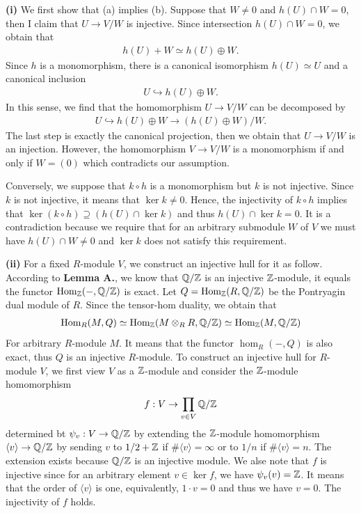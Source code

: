 \begin{solution}
    \textbf{(i)}
    We first show that (a) implies (b). Suppose that $W\neq 0$ and $h(U)\cap W = 0$, then I claim that $U\to V/W$ is injective.
    Since intersection $h(U)\cap W = 0$, we obtain that
    \begin{align*}
        h(U)+W\simeq h(U)\oplus W.
    \end{align*}
    Since $h$ is a monomorphism, there is a canonical isomorphism $h(U)\simeq U$ and a canonical inclusion
    \begin{align*}
        U\hookrightarrow h(U)\oplus W.
    \end{align*}
    In this sense, we find that the homomorphism $U\to V/W$ can be decomposed by 
    \begin{align*}
        U \hookrightarrow h(U)\oplus W \to (h(U)\oplus W)/W.
    \end{align*}
    The last step is exactly the canonical projection, then we obtain that $U\to V/W$ is an injection.
    However, the homomorphism $V\to V/W$ is a monomorphism if and only if $W=(0)$ which contradicts our assumption.

    Conversely, we suppose that $k\circ h$ is a monomorphism but $k$ is not injective. 
    Since $k$ is not injective, it means that $\ker k\neq 0$. Hence, the injectivity of $k\circ h$ implies that $\ker (k\circ h)\supseteq (h(U)\cap \ker k)$ and thus
    $h(U)\cap \ker k=0$. It is a contradiction because we require that for an arbitrary submodule $W$ of $V$ we must have $h(U)\cap W \neq 0$ and $\ker k$ does not satisfy this requirement.

    \textbf{(ii)} For a fixed $R$-module $V$, we construct an injective hull for it as follow.
    According to \textbf{Lemma A.}, we know that $\mathbb{Q}/\mathbb{Z}$ is an injective $\mathbb{Z}$-module, it equals the functor $\operatorname{Hom}_{\mathbb{Z}}(-,\mathbb{Q}/\mathbb{Z})$ is exact.
    Let $Q=\operatorname{Hom}_{\mathbb{Z}}(R,\mathbb{Q}/\mathbb{Z})$ be the Pontryagin dual module of $R$. Since the tensor-hom duality, we obtain that 
    \begin{align*}
        \operatorname{Hom}_R(M,Q)\simeq \operatorname{Hom}_{\mathbb{Z}}(M\otimes_R R,\mathbb{Q}/\mathbb{Z})\simeq \operatorname{Hom}_{\mathbb{Z}}(M,\mathbb{Q}/\mathbb{Z})
    \end{align*}
    For arbitrary $R$-module $M$.
    It means that the functor $\hom_R(-,Q)$ is also exact, thus $Q$ is an injective $R$-module.
    To construct an injective hull for $R$-module $V$, we first view $V$ as a $\mathbb{Z}$-module and consider the $\mathbb{Z}$-module homomorphism
    \begin{align*}
        f:V \to \prod_{v\in V}\mathbb{Q}/\mathbb{Z} 
    \end{align*} 
    determined bt $\psi_v: V \to \mathbb{Q}/\mathbb{Z}$ by extending the $\mathbb{Z}$-module homomorphism $\langle v \rangle\to \mathbb{Q}/\mathbb{Z}$ by sending $v$ to $1/2+\mathbb{Z}$ if $\#\langle v\rangle=\infty$ or to $1/n$ if $\#\langle v\rangle=n$.
    The extension exists because $\mathbb{Q}/\mathbb{Z}$ is an injective module. We alse note that $f$ is injective since for an arbitrary element $v\in \ker f$, we have $\psi_v(v) = \mathbb{Z}$. It means that the order of $\langle v \rangle$ is one,
    equivalently, $1\cdot v=0$ and thus we have $v=0$. The injectivity of $f$ holds.


\end{solution}
